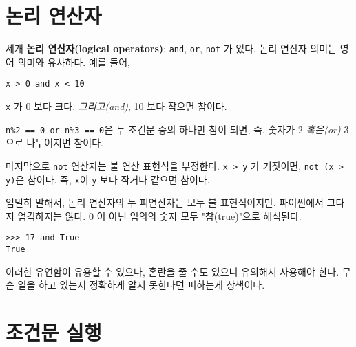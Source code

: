 
\section {논리 연산자}

세개 {\bf 논리 연산자(logical operators)}: {\tt and}, {\tt or}, {\tt not} 가 있다. 
논리 연산자 의미는 영어 의미와 유사하다. 예를 들어,

{\tt x > 0 and x < 10} 

{\tt x} 가 0 보다 크다. \emph{그리고(and)}, 10 보다 작으면 참이다.



{\tt n\%2 == 0 or n\%3 == 0}은 두 조건문 중의 하나만 참이 되면, 즉, 숫자가 2 \emph{혹은(or)} 3으로 나누어지면 참이다.

마지막으로 {\tt not} 연산자는 불 연산 표현식을 부정한다. 
{\tt x > y} 가 거짓이면, {\tt not (x > y)}은 참이다. 즉, {\tt x}이 {\tt y} 보다 작거나 같으면 참이다.

엄밀히 말해서, 논리 연산자의 두 피연산자는 모두 불 표현식이지만, 파이썬에서 그다지 엄격하지는 않다. 
0 이 아닌 임의의 숫자 모두 "참(true)"으로 해석된다.

\beforeverb
\begin{verbatim}
>>> 17 and True
True
\end{verbatim}
\afterverb
%

이러한 유연함이 유용할 수 있으나, 혼란을 줄 수도 있으니 유의해서 사용해야 한다. 
무슨 일을 하고 있는지 정확하게 알지 못한다면 피하는게 상책이다.

\section{조건문 실행}


